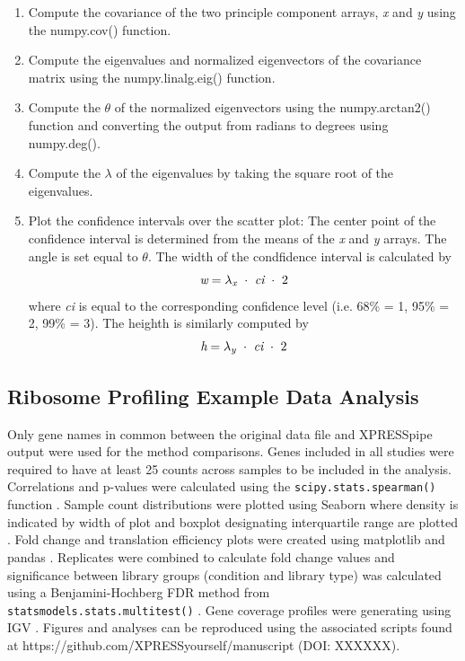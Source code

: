 \documentclass[11pt, a4paper, oneside]{article}
\begin{document}
\begin{enumerate}
  \item Compute the covariance of the two principle component arrays, \textit{x} and \textit{y} using the numpy.cov() function.

  \item Compute the eigenvalues and normalized eigenvectors of the covariance matrix using the numpy.linalg.eig() function.

  \item Compute the $\theta$ of the normalized eigenvectors using the numpy.arctan2() function and converting the output from radians to degrees using numpy.deg().

  \item Compute the $\lambda$ of the eigenvalues by taking the square root of the eigenvalues.

  \item Plot the confidence intervals over the scatter plot: The center point of the confidence interval is determined from the means of the \textit{x} and \textit{y} arrays. The angle is set equal to $\theta$. The width of the condfidence interval is calculated by
  \[
  \textit{w} = \lambda _{\textit{\scriptsize{x}}}\ \cdot\ \textit{ci}\ \cdot\ 2
  \]
  where \textit{ci} is equal to the corresponding confidence level (i.e. 68\% = 1, 95\% = 2, 99\% = 3). The heighth is similarly computed by
  \[
  \textit{h} = \lambda _{\textit{\scriptsize{y}}}\ \cdot\ \textit{ci}\ \cdot\ 2
  \]
\end{enumerate}

\subsection{Ribosome Profiling Example Data Analysis}
Only gene names in common between the original data file and XPRESSpipe output were used for the method comparisons. Genes included in all studies were required to have at least 25 counts across samples to be included in the analysis. Correlations and p-values were calculated using the \texttt{scipy.stats.spearman()} function \cite{spearman_rnaseq}. Sample count distributions were plotted using Seaborn where density is indicated by width of plot and boxplot designating interquartile range are plotted \cite{seaborn}. Fold change and translation efficiency plots were created using matplotlib \cite{matplotlib} and pandas \cite{pandas}. Replicates were combined to calculate fold change values and significance between library groups (condition and library type) was calculated using a Benjamini-Hochberg FDR method from \texttt{statsmodels.stats.multitest()} \cite{statsmodels}. Gene coverage profiles were generating using IGV \cite{igv}. Figures and analyses can be reproduced using the associated scripts found at https://github.com/XPRESSyourself/manuscript (DOI: XXXXXX).
\end{document}
